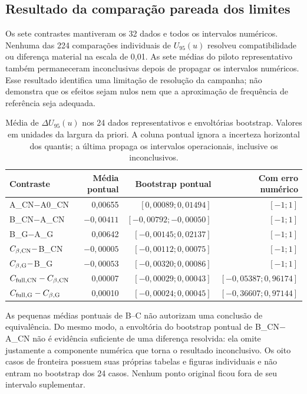\subsection{Resultado da comparação pareada dos limites}
\label{sec:comp-pareado-resultado}

Os sete contrastes mantiveram os 32 dados e todos os intervalos numéricos.
Nenhuma das 224 comparações individuais de $U_{95}(u)$ resolveu
compatibilidade ou diferença material na escala de 0,01. As sete médias
do piloto representativo também permaneceram inconclusivas depois de
propagar os intervalos numéricos. Esse resultado identifica uma
limitação de resolução da campanha; não demonstra que os efeitos sejam
nulos nem que a aproximação de frequência de referência seja adequada.

\begin{table}[htbp]
\centering\small
\caption{Média de $\Delta U_{95}(u)$ nos 24 dados representativos e
envoltórias bootstrap. Valores em unidades da largura da priori.
A coluna pontual ignora a incerteza horizontal dos quantis; a última
propaga os intervalos operacionais, inclusive os inconclusivos.}
\label{tab:comp-pareado-medias}
\begin{tabular}{lrrr}
\toprule
Contraste & Média pontual & Bootstrap pontual & Com erro numérico\\
\midrule
A\_CN$-$A0\_CN & 0,00655 & $[0,00089;0,01494]$ & $[-1;1]$\\
B\_CN$-$A\_CN & $-0,00411$ & $[-0,00792;-0,00050]$ & $[-1;1]$\\
B\_G$-$A\_G & 0,00642 & $[-0,00145;0,02137]$ & $[-1;1]$\\
$C_{\beta,\rm CN}-$B\_CN & $-0,00005$ & $[-0,00112;0,00075]$ & $[-1;1]$\\
$C_{\beta,\rm G}-$B\_G & $-0,00053$ & $[-0,00320;0,00086]$ & $[-1;1]$\\
$C_{{\rm full},\rm CN}-C_{\beta,\rm CN}$ & 0,00007 & $[-0,00029;0,00043]$ & $[-0,05387;0,96174]$\\
$C_{{\rm full},\rm G}-C_{\beta,\rm G}$ & 0,00010 & $[-0,00024;0,00045]$ & $[-0,36607;0,97144]$\\
\bottomrule
\end{tabular}
\end{table}

As pequenas médias pontuais de B--C não autorizam uma conclusão de
equivalência. Do mesmo modo, a envoltória do bootstrap pontual de
B\_CN$-$A\_CN não é evidência suficiente de uma diferença resolvida:
ela omite justamente a componente numérica que torna o resultado
inconclusivo. Os oito casos de fronteira possuem suas próprias tabelas
e figuras individuais e não entram no bootstrap dos 24 casos.
Nenhum ponto original ficou fora de seu intervalo suplementar.

